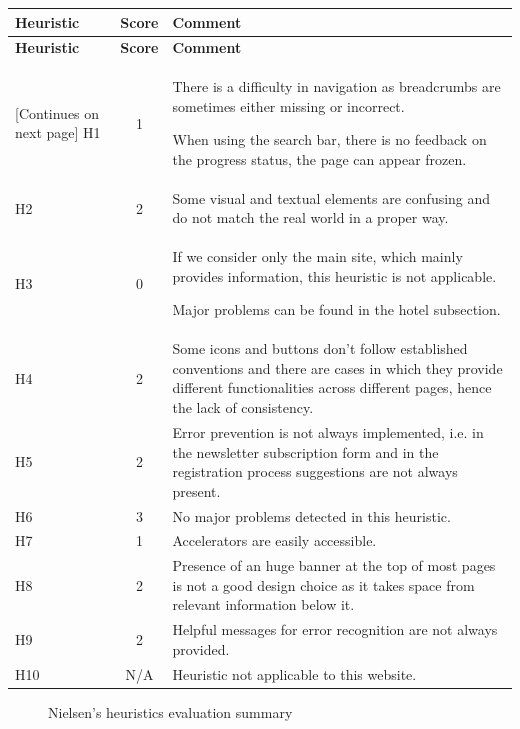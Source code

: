 \begin{tabularx}{\linewidth}{l c X}
\toprule
\textbf{Heuristic} & \textbf{Score} & \textbf{Comment} \\
\midrule
\endfirsthead
\toprule
\textbf{Heuristic} & \textbf{Score} & \textbf{Comment} \\
\midrule
\endhead
\midrule
\footnotesize [Continues on next page]
\endfoot
\bottomrule
\endlastfoot
    H1 & 1 & There is a difficulty in navigation as breadcrumbs are sometimes either missing or incorrect.\par When using the search bar, there is no feedback on the progress status, the page can appear frozen. \\ \midrule
    H2 & 2 & Some visual and textual elements are confusing and do not match the real world in a proper way.\\ \midrule
    H3 & 0 & If we consider only the main site, which mainly provides information, this heuristic is not applicable.\par Major problems can be found in the hotel subsection.\\ \midrule
    H4 & 2 & Some icons and buttons don't follow established conventions and there are cases in which they provide different functionalities across different pages, hence the lack of consistency.\\ \midrule
    H5 & 2 & Error prevention is not always implemented, i.e. in the newsletter subscription form and in the registration process suggestions are not always present.\\ \midrule
    H6 & 3 & No major problems detected in this heuristic.\\ \midrule
    H7 & 1 & Accelerators are easily accessible.\\ \midrule
    H8 & 2 & Presence of an huge banner at the top of most pages is not a good design choice as it takes space from relevant information below it.\\ \midrule
    H9 & 2 & Helpful messages for error recognition are not always provided.\\ \midrule
    H10 & N/A & Heuristic not applicable to this website.
\end{tabularx}

\begin{figure}[!ht]
    \begin{minipage}{\linewidth}
        \centering
        \caption{Nielsen's heuristics evaluation summary}
        \label{BarsNielsenCrop}
    \end{minipage}
\end{figure}

